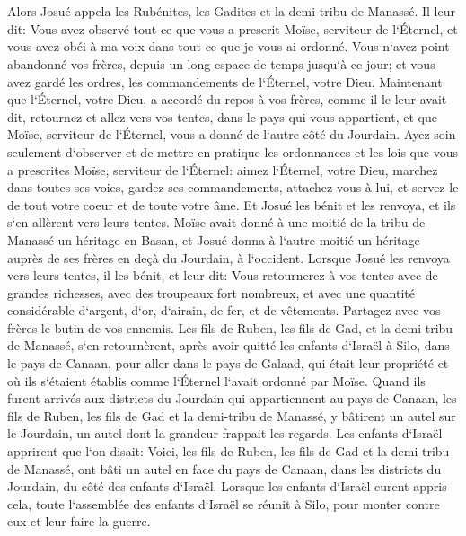 \chapter{}

\verse Alors Josué appela les Rubénites, les Gadites et la demi-tribu de Manassé. 
\verse Il leur dit: Vous avez observé tout ce que vous a prescrit Moïse, serviteur de l`Éternel, et vous avez obéi à ma voix dans tout ce que je vous ai ordonné. 
\verse Vous n`avez point abandonné vos frères, depuis un long espace de temps jusqu`à ce jour; et vous avez gardé les ordres, les commandements de l`Éternel, votre Dieu. 
\verse Maintenant que l`Éternel, votre Dieu, a accordé du repos à vos frères, comme il le leur avait dit, retournez et allez vers vos tentes, dans le pays qui vous appartient, et que Moïse, serviteur de l`Éternel, vous a donné de l`autre côté du Jourdain. 
\verse Ayez soin seulement d`observer et de mettre en pratique les ordonnances et les lois que vous a prescrites Moïse, serviteur de l`Éternel: aimez l`Éternel, votre Dieu, marchez dans toutes ses voies, gardez ses commandements, attachez-vous à lui, et servez-le de tout votre coeur et de toute votre âme. 
\verse Et Josué les bénit et les renvoya, et ils s`en allèrent vers leurs tentes. 
\verse Moïse avait donné à une moitié de la tribu de Manassé un héritage en Basan, et Josué donna à l`autre moitié un héritage auprès de ses frères en deçà du Jourdain, à l`occident. Lorsque Josué les renvoya vers leurs tentes, il les bénit, 
\verse et leur dit: Vous retournerez à vos tentes avec de grandes richesses, avec des troupeaux fort nombreux, et avec une quantité considérable d`argent, d`or, d`airain, de fer, et de vêtements. Partagez avec vos frères le butin de vos ennemis. 
\verse Les fils de Ruben, les fils de Gad, et la demi-tribu de Manassé, s`en retournèrent, après avoir quitté les enfants d`Israël à Silo, dans le pays de Canaan, pour aller dans le pays de Galaad, qui était leur propriété et où ils s`étaient établis comme l`Éternel l`avait ordonné par Moïse. 
\verse Quand ils furent arrivés aux districts du Jourdain qui appartiennent au pays de Canaan, les fils de Ruben, les fils de Gad et la demi-tribu de Manassé, y bâtirent un autel sur le Jourdain, un autel dont la grandeur frappait les regards. 
\verse Les enfants d`Israël apprirent que l`on disait: Voici, les fils de Ruben, les fils de Gad et la demi-tribu de Manassé, ont bâti un autel en face du pays de Canaan, dans les districts du Jourdain, du côté des enfants d`Israël. 
\verse Lorsque les enfants d`Israël eurent appris cela, toute l`assemblée des enfants d`Israël se réunit à Silo, pour monter contre eux et leur faire la guerre. 

